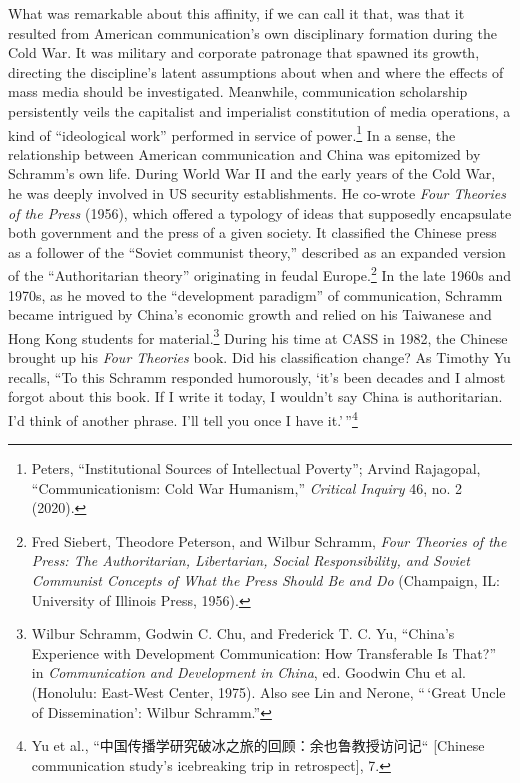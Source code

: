 \documentclass{tufte-handout}
\begin{document}
\begin{CJK*}{UTF8}{gbsn}
What was remarkable about this affinity, if we can call it that, was
that it resulted from American communication's own disciplinary
formation during the Cold War. It was military and corporate patronage
that spawned its growth, directing the discipline's latent assumptions
about when and where the effects of mass media should be investigated.
Meanwhile, communication scholarship persistently veils the capitalist
and imperialist constitution of media operations, a kind of
``ideological work'' performed in service of power.\footnote{Peters,
  ``Institutional Sources of Intellectual Poverty''; Arvind Rajagopal,
  ``Communicationism: Cold War Humanism,'' \emph{Critical Inquiry} 46,
  no. 2 (2020).} In a sense, the relationship between American
communication and China was epitomized by Schramm's own life. During
World War II and the early years of the Cold War, he was deeply involved
in US security establishments. He co-wrote \emph{Four Theories of the
Press} (1956), which offered a typology of ideas that supposedly
encapsulate both government and the press of a given society. It
classified the Chinese press as a follower of the ``Soviet communist
theory,'' described as an expanded version of the ``Authoritarian
theory'' originating in feudal Europe.\footnote{Fred Siebert, Theodore
  Peterson, and Wilbur Schramm, \emph{Four Theories of the Press: The
  Authoritarian, Libertarian, Social Responsibility, and Soviet
  Communist Concepts of What the Press Should Be and Do} (Champaign, IL:
  University of Illinois Press, 1956).} In the late 1960s and 1970s, as
he moved to the ``development paradigm'' of communication, Schramm
became intrigued by China's economic growth and relied on his Taiwanese
and Hong Kong students for material.\footnote{Wilbur Schramm, Godwin C.
  Chu, and Frederick T. C. Yu, ``China's Experience with Development
  Communication: How Transferable Is That?'' in \emph{Communication and
  Development in China}, ed. Goodwin Chu et al. (Honolulu: East-West
  Center, 1975). Also see Lin and Nerone, ``\,`Great Uncle of
  Dissemination': Wilbur Schramm.''} During his time at CASS in 1982,
the Chinese brought up his \emph{Four Theories} book. Did his
classification change? As Timothy Yu recalls, ``To this Schramm
responded humorously, `it's been decades and I almost forgot about this
book. If I write it today, I wouldn't say China is authoritarian. I'd
think of another phrase. I'll tell you once I have it.'\,''\footnote{Yu
  et al., ``中国传播学研究破冰之旅的回顾：余也鲁教授访问记`` {[}Chinese
  communication study's icebreaking trip in retrospect{]}, 7.}




\end{CJK*}
\end{document}
